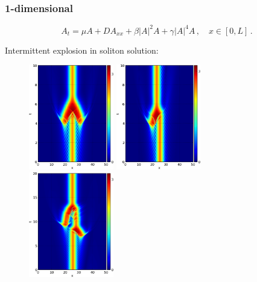 \documentclass[mathserif, handout]{beamer}
\begin{document}
\begin{frame}
  \frametitle{ \scriptsize{1-dimensional \cqcGLe{}} }

  \begin{equation}
    \label{eq:cqcgl1d}
    A_t = \mu A + DA_{xx} + \beta |A|^2A + \gamma |A|^4A \,,\quad x\in[0,L]
    \,.
  \end{equation}

  Intermittent explosion in soliton solution:
  \begin{figure}[h]
    \centering
    \includegraphics[width=0.33\textwidth]{symmetricExplosion}%
    \includegraphics[width=0.33\textwidth]{asymmetricExplosion1}%
    \includegraphics[width=0.33\textwidth]{asymmetricExplosion2}
    \label{fig:explosionTypes}
  \end{figure}

\end{frame}
\end{document}
